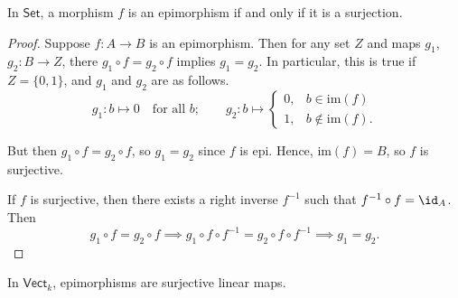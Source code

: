 \documentclass[notes.tex]{subfiles}
\begin{document}
\begin{theorem}
  \label{thm:epimorphismsinset}
  In $\mathsf{Set}$, a morphism $f$ is an epimorphism if and only if it is a surjection.
\end{theorem}
\begin{proof}
  Suppose $f\colon A \to B$ is an epimorphism. Then for any set $Z$ and maps $g_{1}$, $g_{2}\colon B \to Z$, there $g_{1} \circ f = g_{2} \circ f$ implies $g_{1} = g_{2}$. In particular, this is true if $Z = \{ 0, 1 \}$, and $g_{1}$ and $g_{2}$ are as follows.
  \begin{equation*}
    g_{1}\colon b \mapsto 0 \quad \text{for all } b;\qquad g_{2}\colon b \mapsto
    \begin{cases}
      0, &b \in \mathrm{im}(f) \\
      1, &b \notin \mathrm{im}(f).
    \end{cases}
  \end{equation*}

  But then $g_{1} \circ f = g_{2} \circ f$, so $g_{1} = g_{2}$ since $f$ is epi. Hence, $\mathrm{im}(f) = B$, so $f$ is surjective.

  If $f$ is surjective, then there exists a right inverse $f^{-1}$ such that $f^{-1} \circ f = \id_{A}$. Then
  \begin{equation*}
    g_{1} \circ f = g_{2} \circ f \implies g_{1} \circ f \circ f^{-1} = g_{2} \circ f \circ f^{-1} \implies g_{1} = g_{2}.
  \end{equation*}
\end{proof}

\begin{example}
  In $\mathsf{Vect}_{k}$, epimorphisms are surjective linear maps.
\end{example}
\end{document}
